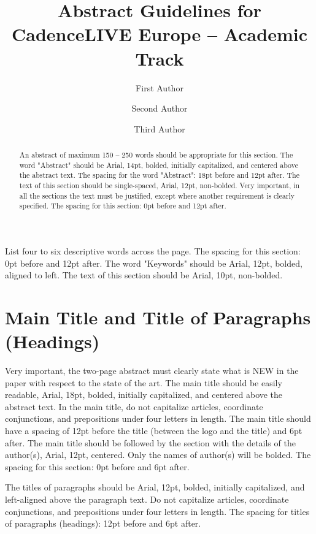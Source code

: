 \documentclass[a4paper,10pt]{article}
\title {Abstract Guidelines for CadenceLIVE Europe -- Academic Track}
\author[*]{First Author}
\author[**]{Second Author}
\author[***]{Third Author}
\affil[*]{company, address, town, country}
\affil[**]{company, address, town, country}
\affil[***]{company, address, town, country}
\begin{document}
\maketitle

\begin{abstract}
An abstract of maximum 150 – 250 words should be appropriate for this section.
The word "Abstract" should be Arial, 14pt, bolded, initially capitalized, and
centered above the abstract text. The spacing for the word "Abstract": 18pt
before and 12pt after. The text of this section should be single-spaced, Arial,
12pt, non-bolded. Very important, in all the sections the text must be
justified, except where another requirement is clearly specified. The spacing
for this section: 0pt before and 12pt after. 
\end{abstract}

\begin{keywords}
List four to six descriptive words across the page. The spacing for this
section: 0pt before and 12pt after. The word "Keywords" should be Arial, 12pt,
bolded, aligned to left. The text of this section should be Arial, 10pt,
non-bolded.
\end{keywords}

\section*{Main Title and Title of Paragraphs (Headings)}

Very important, the two-page abstract must clearly state what is NEW in the
paper with respect to the state of the art. The main title should be easily
readable, Arial, 18pt, bolded, initially capitalized, and centered above the
abstract text. In the main title, do not capitalize articles, coordinate
conjunctions, and prepositions under four letters in length. The main title
should have a spacing of 12pt before the title (between the logo and the title)
and 6pt after. The main title should be followed by the section with the
details of the author(s), Arial, 12pt, centered. Only the names of author(s)
will be bolded. The spacing for this section: 0pt before and 6pt after. 

The titles of paragraphs should be Arial, 12pt, bolded, initially capitalized,
and left-aligned above the paragraph text. Do not capitalize articles,
coordinate conjunctions, and prepositions under four letters in length. The
spacing for titles of paragraphs (headings): 12pt before and 6pt after. 
\end{document}
